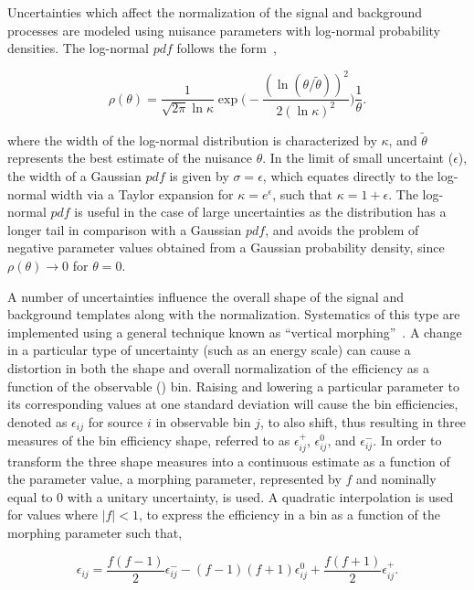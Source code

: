 Uncertainties which affect the normalization of the signal and background processes are modeled using nuisance parameters with log-normal probability densities. The log-normal $pdf$ follows the form~\cite{CMS-NOTE-2011-005},

\begin{equation}
  \rho(\theta) = \frac{1}{\sqrt{2\pi}\ln{\kappa}}\exp{\bigg(-\frac{(\ln{(\theta/\widetilde{\theta})})^2}{2(\ln{\kappa})^2}\bigg)}\frac{1}{\theta}.
\end{equation}

where the width of the log-normal distribution is characterized by $\kappa$, and $\widetilde{\theta}$ represents the best estimate of the nuisance $\theta$. In the limit of small uncertaint ($\epsilon$), the width of a Gaussian $pdf$ is given by $\sigma=\epsilon$, which equates directly to the log-normal width via a Taylor expansion for $\kappa = e^{\epsilon}$, such that $\kappa=1+\epsilon$. The log-normal $pdf$ is useful in the case of large uncertainties as the distribution has a longer tail in comparison with a Gaussian $pdf$, and avoids the problem of negative parameter values obtained from a Gaussian probability density, since $\rho(\theta)\rightarrow0$ for $\theta=0$.

A number of uncertainties influence the overall shape of the signal and background \ptmiss templates along with the normalization. Systematics of this type are implemented using a general technique known as ``vertical morphing''~\cite{Conway:2011in}. A change in a particular type of uncertainty (such as an energy scale) can cause a distortion in both the shape and overall normalization of the efficiency as a function of the observable (\ptmiss) bin. Raising and lowering a particular parameter to its corresponding values at one standard deviation will cause the bin efficiencies, denoted as $\epsilon_{ij}$ for source $i$ in observable bin $j$, to also shift, thus resulting in three measures of the bin efficiency shape, referred to as $\epsilon^{+}_{ij}$, $\epsilon^{0}_{ij}$, and $\epsilon^{-}_{ij}$. In order to transform the three shape measures into a continuous estimate as a function of the parameter value, a morphing parameter, represented by $f$ and nominally equal to 0 with a unitary uncertainty, is used. A quadratic interpolation is used for values where $|f|<1$, to express the efficiency in a bin as a function of the morphing parameter such that, 

\begin{equation}
  \epsilon_{ij} = \frac{f(f-1)}{2}\epsilon^{-}_{ij} - (f-1)(f+1)\epsilon^{0}_{ij} + \frac{f(f+1)}{2}\epsilon^{+}_{ij}.
  \label{eq:morph}
\end{equation}

